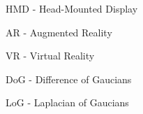 

\begin{list_type}
\item HMD	-	Head-Mounted Display
\item AR	-	Augmented Reality
\item VR	-	Virtual Reality
\item DoG	-	Difference of Gaucians
\item LoG	-	Laplacian of Gaucians
\end{list_type}

